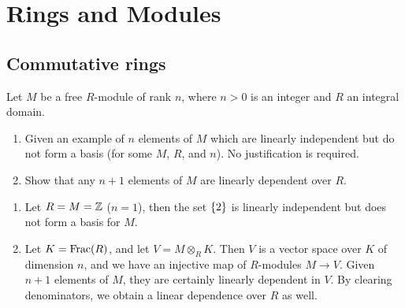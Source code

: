 \section{Rings and Modules}

\subsection*{Commutative rings}

\begin{question}[subtitle = January 2026 Problem 2,ID=Jan26_2]
Let $M$ be a free $R$-module of rank $n$, where $n > 0$ is an integer and $R$ an integral domain.
\begin{enumerate}
    \item Given an example of $n$ elements of $M$ which are linearly independent but do not form a basis (for some $M$, $R$, and $n$). No justification is required.
    \item Show that any $n+1$ elements of $M$ are linearly dependent over $R$.
\end{enumerate}
\end{question}
\begin{solution}
\begin{enumerate}
    \item Let $R = M = \mathbb{Z}$ ($n = 1$), then the set $\{2\}$ is linearly independent but does not form a basis for $M$.
    \item Let $K = \operatorname{Frac}(R)$, and let $V = M \otimes_R K$. Then $V$ is a vector space over $K$ of dimension $n$, and we have an injective map of $R$-modules $M \to V$. Given $n+1$ elements of $M$, they are certainly linearly dependent in $V$. By clearing denominators, we obtain a linear dependence over $R$ as well. 
\end{enumerate}
\end{solution}

